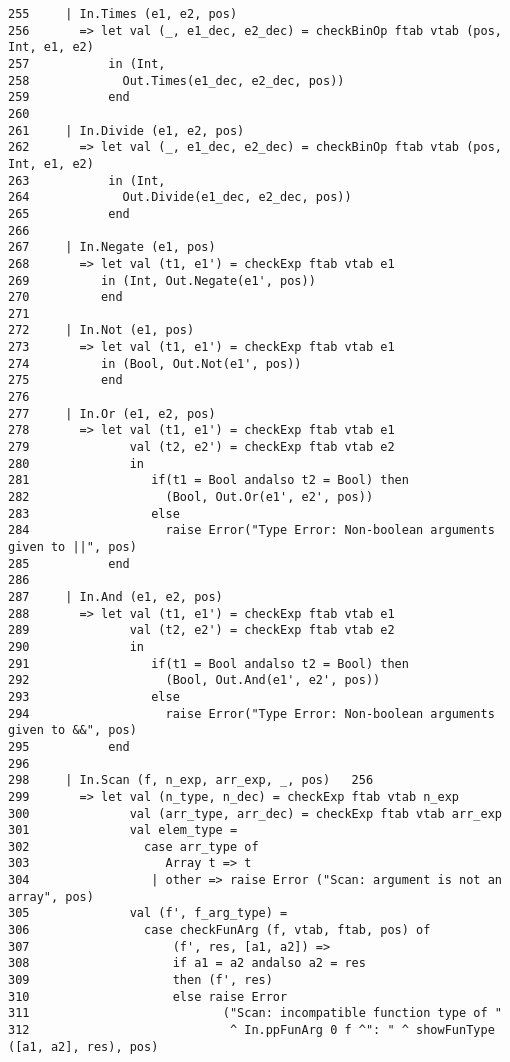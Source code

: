\documentclass[paper=a4, fontsize=11pt]{scrartcl} %
\numberwithin{equation}{section} %
\numberwithin{figure}{section} %
\numberwithin{table}{section} %
\begin{document}
\begin{lstlisting}
255     | In.Times (e1, e2, pos)	 
256	      => let val (_, e1_dec, e2_dec) = checkBinOp ftab vtab (pos, Int, e1, e2) 	 	
257	          in (Int,  	 	
258	            Out.Times(e1_dec, e2_dec, pos))  	 	
259	          end   	 	
260	 	 	
261	    | In.Divide (e1, e2, pos) 	 	
262	      => let val (_, e1_dec, e2_dec) = checkBinOp ftab vtab (pos, Int, e1, e2) 	 	
263	          in (Int,  	 	
264	            Out.Divide(e1_dec, e2_dec, pos))  	 	
265	          end 	 	
266	 	 	
267	    | In.Negate (e1, pos) 	 	
268	      => let val (t1, e1') = checkExp ftab vtab e1 	 	
269	         in (Int, Out.Negate(e1', pos)) 	 	
270	         end 	 	
271	     	 	
272	    | In.Not (e1, pos) 	 	
273	      => let val (t1, e1') = checkExp ftab vtab e1 	 	
274	         in (Bool, Out.Not(e1', pos)) 	 	
275	         end   	 	
276	 	 	
277	    | In.Or (e1, e2, pos) 	 	
278	      => let val (t1, e1') = checkExp ftab vtab e1 	 	
279	             val (t2, e2') = checkExp ftab vtab e2 	 	
280	             in 	 	
281	                if(t1 = Bool andalso t2 = Bool) then 	 	
282	                  (Bool, Out.Or(e1', e2', pos)) 	 	
283	                else 	 	
284	                  raise Error("Type Error: Non-boolean arguments given to ||", pos) 	 	
285	          end 	 	
286	 	 	
287	    | In.And (e1, e2, pos) 	 	
288	      => let val (t1, e1') = checkExp ftab vtab e1 	 	
289	             val (t2, e2') = checkExp ftab vtab e2 	 	
290	             in 	 	
291	                if(t1 = Bool andalso t2 = Bool) then 	 	
292	                  (Bool, Out.And(e1', e2', pos)) 	 	
293	                else 	 	
294	                  raise Error("Type Error: Non-boolean arguments given to &&", pos) 	 	
295	          end   	 	
296	     	 	
298	    | In.Scan (f, n_exp, arr_exp, _, pos)	256	 
299	      => let val (n_type, n_dec) = checkExp ftab vtab n_exp 	 	
300	             val (arr_type, arr_dec) = checkExp ftab vtab arr_exp 	 	
301	             val elem_type = 	 	
302	               case arr_type of 	 	
303	                  Array t => t 	 	
304	                | other => raise Error ("Scan: argument is not an array", pos) 	 	
305	             val (f', f_arg_type) =  	 	
306	               case checkFunArg (f, vtab, ftab, pos) of 	 	
307	                   (f', res, [a1, a2]) => 	 	
308	                   if a1 = a2 andalso a2 = res 	 	
309	                   then (f', res) 	 	
310	                   else raise Error 	 	
311	                          ("Scan: incompatible function type of " 	 	
312	                           ^ In.ppFunArg 0 f ^": " ^ showFunType ([a1, a2], res), pos) 	 	

\end{lstlisting}
\end{document}
